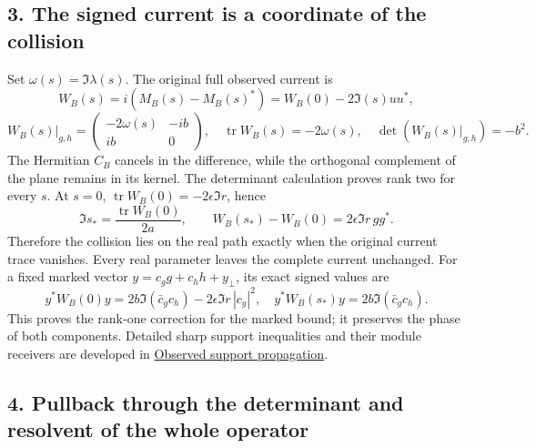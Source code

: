 \documentclass[
]{article}
\begin{document}
\subsection{3. The signed current is a coordinate of the
collision}\label{the-signed-current-is-a-coordinate-of-the-collision}

Set \(\omega(s)=\Im\lambda(s)\). The original full observed current is
\[
W_B(s)=i(M_B(s)-M_B(s)^*)=W_B(0)-2\Im(s)uu^*,
\] \[
W_B(s)|_{g,h}=\begin{pmatrix}-2\omega(s)&-ib\\ib&0\end{pmatrix},
\quad \operatorname{tr}W_B(s)=-2\omega(s),
\quad \det(W_B(s)|_{g,h})=-b^2.
\tag{OC11}
\] The Hermitian \(C_B\) cancels in the difference, while the orthogonal
complement of the plane remains in its kernel. The determinant
calculation proves rank two for every \(s\). At \(s=0\),
\(\operatorname{tr}W_B(0)=-2\epsilon\Im r\), hence \[
\Im s_*=\frac{\operatorname{tr}W_B(0)}{2a},\qquad
W_B(s_*)-W_B(0)=2\epsilon\Im r\,gg^*.
\] Therefore the collision lies on the real path exactly when the
original current trace vanishes. Every real parameter leaves the
complete current unchanged. For a fixed marked vector
\(y=c_g g+c_hh+y_\perp\), its exact signed values are \[
y^*W_B(0)y=2b\Im(\bar c_g c_h)-2\epsilon\Im r\,|c_g|^2,
\quad y^*W_B(s_*)y=2b\Im(\bar c_g c_h).
\] This proves the rank-one correction for the marked bound; it
preserves the phase of both components. Detailed sharp support
inequalities and their module receivers are developed in
\href{https://github.com/KokunoYumeto/zeta-function-research-reader/blob/c9df443d9e1df000dfbb083943f97197e746eb08/workbenches/splitzero-tandem/branches/identity-absorber-square/OBSERVED_SUPPORT_PROPAGATION.md}{Observed
support propagation}.

\subsection{4. Pullback through the determinant and resolvent of the
whole
operator}\label{pullback-through-the-determinant-and-resolvent-of-the-whole-operator}
\end{document}
